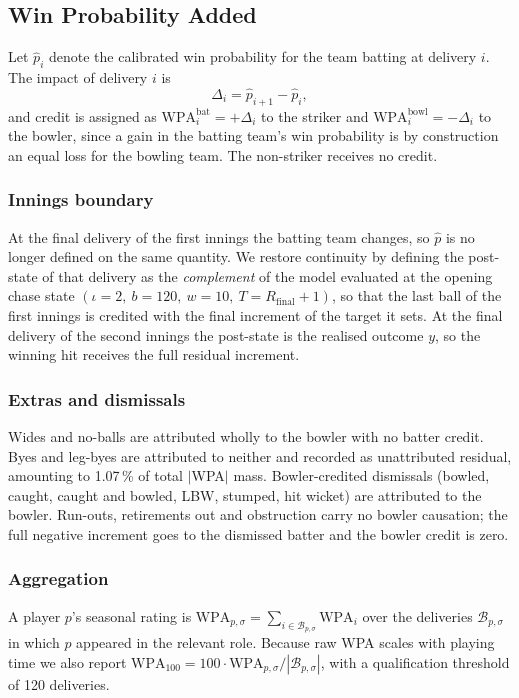 \documentclass[conference]{IEEEtran}
\begin{document}
\subsection{Win Probability Added}

Let $\hat{p}_i$ denote the calibrated win probability for the team
batting at delivery $i$. The impact of delivery $i$ is
\[
\Delta_i = \hat{p}_{i+1} - \hat{p}_i ,
\]
and credit is assigned as
$\text{WPA}^{\text{bat}}_{i} = +\Delta_i$ to the striker and
$\text{WPA}^{\text{bowl}}_{i} = -\Delta_i$ to the bowler, since a gain
in the batting team's win probability is by construction an equal loss
for the bowling team. The non-striker receives no credit.

\subsubsection{Innings boundary}
At the final delivery of the first innings the batting team changes, so
$\hat{p}$ is no longer defined on the same quantity. We restore
continuity by defining the post-state of that delivery as the
\emph{complement} of the model evaluated at the opening chase state
$(\iota{=}2,\ b{=}120,\ w{=}10,\ T{=}R_{\text{final}}+1)$, so that the
last ball of the first innings is credited with the final increment of
the target it sets. At the final delivery of the second innings the
post-state is the realised outcome $y$, so the winning hit receives the
full residual increment.

\subsubsection{Extras and dismissals}
Wides and no-balls are attributed wholly to the bowler with no batter
credit. Byes and leg-byes are attributed to neither and recorded as
unattributed residual, amounting to 1.07\,\% of total $|$WPA$|$ mass.
Bowler-credited dismissals (bowled, caught, caught and bowled, LBW,
stumped, hit wicket) are attributed to the bowler. Run-outs,
retirements out and obstruction carry no bowler causation; the full
negative increment goes to the dismissed batter and the bowler credit is
zero.

\subsubsection{Aggregation}
A player $p$'s seasonal rating is
$\text{WPA}_{p,\sigma} = \sum_{i \in \mathcal{B}_{p,\sigma}} \text{WPA}_i$
over the deliveries $\mathcal{B}_{p,\sigma}$ in which $p$ appeared in
the relevant role. Because raw WPA scales with playing time we also
report
$\text{WPA}_{100} = 100 \cdot \text{WPA}_{p,\sigma} / |\mathcal{B}_{p,\sigma}|$,
with a qualification threshold of 120 deliveries.
\end{document}

